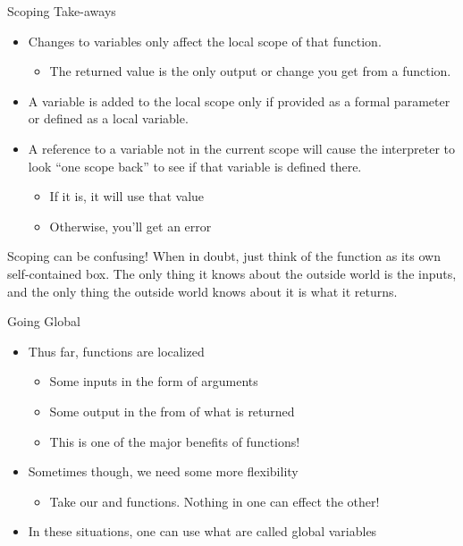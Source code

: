 \documentclass[pdf, aspectratio=169, 12pt]{beamer}
\begin{document}
\begin{frame}{Scoping Take-aways}
	\begin{itemize}
		\item Changes to variables only affect the local scope of that function.
			\begin{itemize}
				\item The returned value is the only output or change you get from a function.
			\end{itemize}
			
		\item A variable is added to the local scope only if provided as a formal parameter or defined as a \alert{local variable}.
		\item A reference to a variable not in the current scope will cause the interpreter to look ``one scope back'' to see if that variable is defined there.
			\begin{itemize}
				\item If it is, it will use that value
				\item Otherwise, you'll get an error
			\end{itemize}
			
	\end{itemize}
	\pause
	\begin{center}
		\color{Red}
		Scoping can be confusing! When in doubt, just think of the function as its own self-contained box. The only thing it knows about the outside world is the inputs, and the only thing the outside world knows about it is what it returns.
	\end{center}
\end{frame}

\begin{frame}{Going Global}
	\begin{itemize}
		\item<+-> Thus far, functions are localized
			\begin{itemize}
				\item Some inputs in the form of arguments
				\item Some output in the from of what is returned
				\item This is one of the major benefits of functions!
			\end{itemize}
		\item<+-> Sometimes though, we need some more flexibility
			\begin{itemize}
				\item Take our  and  functions. Nothing in one can effect the other!
			\end{itemize}
		\item<+-> In these situations, one can use what are called \alert{global variables}
	\end{itemize}
\end{frame}
\end{document}
